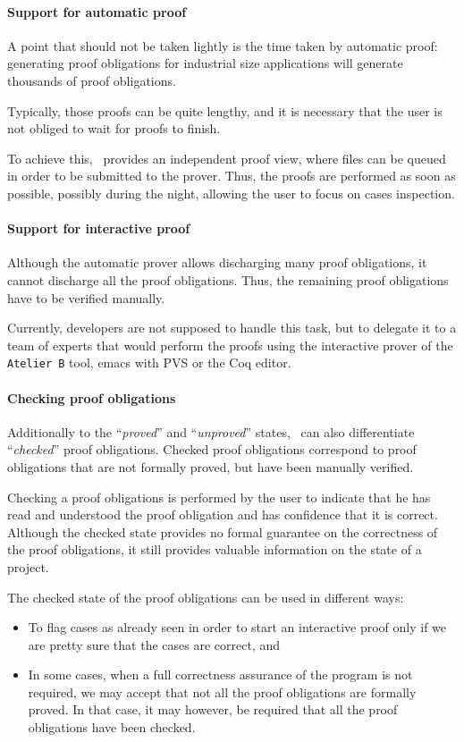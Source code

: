 \paragraph{Support for automatic proof}
\label{Support for automatic proof}
 A point that should not be taken lightly is the time taken by
automatic proof: generating proof obligations for industrial size
applications will generate thousands of proof obligations.

Typically, those proofs can be quite lengthy, and it is necessary that
the user is not obliged to wait for proofs to finish.

To achieve this, \JACK\ provides an independent proof view, where files can be queued in order to be submitted to
the prover. Thus, the proofs are performed as soon as possible, possibly during the night, allowing the user to
focus on cases inspection.
\paragraph{Support for interactive proof}
Although the automatic prover allows discharging many proof
obligations, it cannot discharge all the proof obligations. Thus, the
remaining proof obligations have to be verified manually.

Currently, developers are not supposed to handle this task, but to
delegate it to a team of experts that would perform the proofs using
the interactive prover of the \texttt{Atelier B} tool, emacs with PVS or the Coq editor.

\paragraph{Checking proof obligations}
Additionally to the ``\textit{proved}'' and ``\textit{unproved}''
states, \JACK\ can also differentiate ``\textit{checked}'' proof
obligations. Checked proof obligations correspond to proof obligations
that are not formally proved, but have been manually verified.

Checking a proof obligations is performed by the user to indicate that
he has read and understood the proof obligation and has confidence
that it is correct. Although the checked state provides no formal
guarantee on the correctness of the proof obligations, it still
provides valuable information on the state of a project.

The checked state of the proof obligations can be used in different
ways:
\begin{itemize}
\item To flag cases as already seen in order to start an interactive
   proof only if we are pretty sure that the cases are correct, and
\item In some cases, when a full correctness assurance of the program is not
   required, we may accept that not all the proof obligations are
   formally proved. In that case, it may however, be required that all
   the proof obligations have been checked.
\end{itemize}
